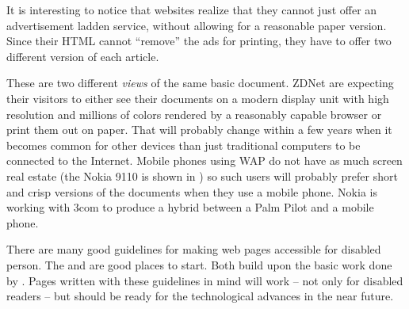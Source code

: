 It is interesting to notice that websites realize that they cannot
just offer an advertisement ladden service, without allowing for a
reasonable paper version.  Since their HTML cannot ``remove'' the ads
for printing, they have to offer two different version of each
article.


These are two different \textit{views} of the same basic document.
ZDNet are expecting their visitors to either see their documents on a
modern display unit with high resolution and millions of colors
rendered by a reasonably capable browser or print them out on paper.
That will probably change within a few years when it becomes common
for other devices than just traditional computers to be connected to
the Internet.  Mobile phones using WAP do not have as much screen real
estate (the Nokia 9110 is shown in ) so such
users will probably prefer short and crisp versions of the documents
when they use a mobile phone.  Nokia is working with 3com to produce a
hybrid between a Palm Pilot and a mobile phone.


There are many good guidelines for making web pages accessible for
disabled person.  The
 and
 are good places to start.  Both build upon
the basic work done by
.  Pages written with these guidelines in mind will work
-- not only for disabled readers -- but should be ready for the
technological advances in the near future.

